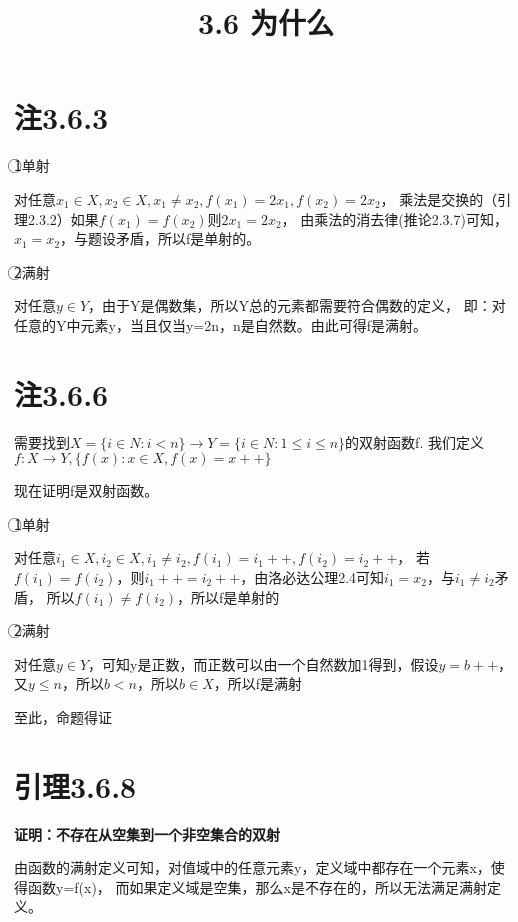 \documentclass{article}
\theoremstyle{mystyle}
\theoremstyle{zproofstyle}
\begin{document}
\title{3.6 为什么}
\maketitle

\section*{注3.6.3}
\textcircled{1}单射

对任意$x_1 \in X, x_2 \in X, x_1 \neq x_2, f(x_1)=2x_1,f(x_2)=2x_2$，
乘法是交换的（引理2.3.2）如果$f(x_1)=f(x_2)$则$2x_1=2x_2$，
由乘法的消去律(推论2.3.7)可知，$x_1=x_2$，与题设矛盾，所以f是单射的。

\textcircled{2}满射

对任意$y \in Y$，由于Y是偶数集，所以Y总的元素都需要符合偶数的定义，
即：对任意的Y中元素y，当且仅当y=2n，n是自然数。由此可得f是满射。

\section*{注3.6.6}
需要找到$X=\{i \in N: i<n\} \rightarrow Y=\{i \in N: 1\leq i \leq n \}$的双射函数f.
我们定义$f: X \rightarrow Y, \{f(x): x \in X, f(x) = x ++\}$

现在证明f是双射函数。

\textcircled{1}单射

对任意$i_1 \in X, i_2 \in X, i_1 \neq i_2, f(i_1) = i_1++, f(i_2) = i_2++$，
若$f(i_1) = f(i_2)$，则$i_1++ = i_2++$，由洛必达公理2.4可知$i_1 = x_2$，与$i_1 \neq i_2$矛盾，
所以$f(i_1) \neq f(i_2)$，所以f是单射的

\textcircled{2}满射

对任意$y \in Y$，可知y是正数，而正数可以由一个自然数加1得到，假设$y = b++$，
又$y \leq n$，所以$b < n$，所以$b \in X$，所以f是满射

至此，命题得证


\section*{引理3.6.8}
\textbf{证明：不存在从空集到一个非空集合的双射}

由函数的满射定义可知，对值域中的任意元素y，定义域中都存在一个元素x，使得函数y=f(x)，
而如果定义域是空集，那么x是不存在的，所以无法满足满射定义。
\end{document}

